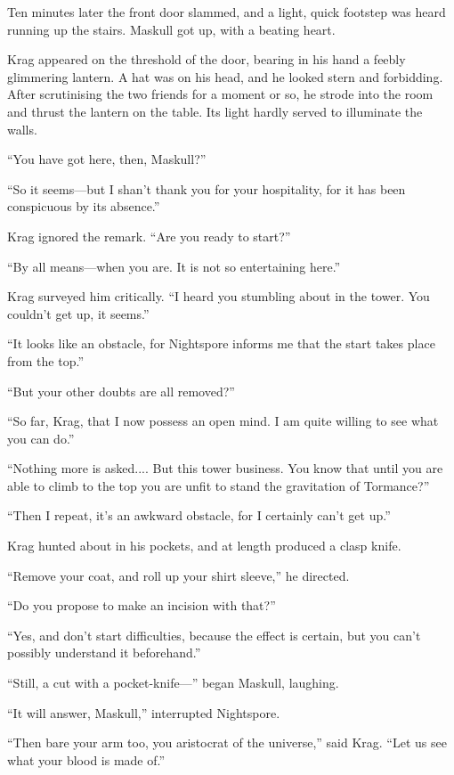 Ten minutes later the front door slammed, and a light, quick footstep was heard running up the stairs. Maskull got up, with a beating heart.

Krag appeared on the threshold of the door, bearing in his hand a feebly glimmering lantern. A hat was on his head, and he looked stern and forbidding. After scrutinising the two friends for a moment or so, he strode into the room and thrust the lantern on the table. Its light hardly served to illuminate the walls.

``You have got here, then, Maskull?''

``So it seems—but I shan't thank you for your hospitality, for it has been conspicuous by its absence.''

Krag ignored the remark. ``Are you ready to start?''

``By all means—when you are. It is not so entertaining here.''

Krag surveyed him critically. ``I heard you stumbling about in the tower. You couldn't get up, it seems.''

``It looks like an obstacle, for Nightspore informs me that the start takes place from the top.''

``But your other doubts are all removed?''

``So far, Krag, that I now possess an open mind. I am quite willing to see what you can do.''

``Nothing more is asked.... But this tower business. You know that until you are able to climb to the top you are unfit to stand the gravitation of Tormance?''

``Then I repeat, it's an awkward obstacle, for I certainly can't get up.''

Krag hunted about in his pockets, and at length produced a clasp knife.

``Remove your coat, and roll up your shirt sleeve,'' he directed.

``Do you propose to make an incision with that?''

``Yes, and don't start difficulties, because the effect is certain, but you can't possibly understand it beforehand.''

``Still, a cut with a pocket-knife—'' began Maskull, laughing.

``It will answer, Maskull,'' interrupted Nightspore.

``Then bare your arm too, you aristocrat of the universe,'' said Krag. ``Let us see what your blood is made of.''


